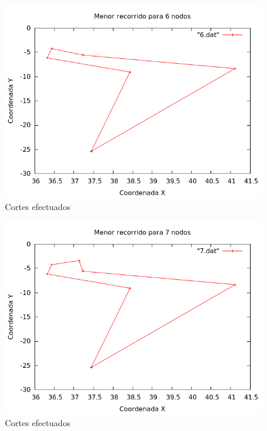 \begin{figure}[H]
    \centering
    \includegraphics[scale=0.5]{../TSP/Graficas/6.png}
    \caption{Cortes efectuados}
\end{figure}

\begin{figure}[H]
    \centering
    \includegraphics[scale=0.5]{../TSP/Graficas/7.png}
    \caption{Cortes efectuados}
\end{figure}

